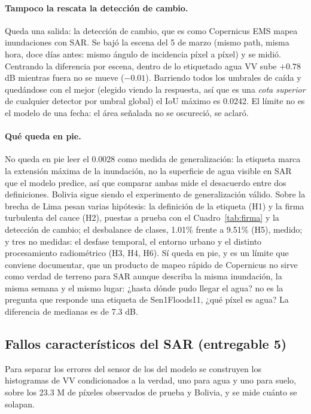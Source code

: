 \documentclass{article}
\begin{document}
\paragraph{Tampoco la rescata la detección de cambio.}
Queda una salida: la detección de cambio, que es como Copernicus EMS mapea
inundaciones con SAR. Se bajó la escena del 5 de
marzo (mismo path, misma hora, doce días antes: mismo ángulo de incidencia
píxel a píxel) y se midió. Centrando la diferencia por escena, dentro de lo
etiquetado agua VV sube $+0.78$ dB mientras fuera no se mueve ($-0.01$).
Barriendo todos los umbrales de caída y quedándose con el mejor (elegido
viendo la respuesta, así que es una \emph{cota superior} de cualquier detector
por umbral global) el IoU máximo es 0.0242. El límite no es el modelo
de una fecha: el área señalada no se oscureció, se aclaró.

\paragraph{Qué queda en pie.}
No queda en pie leer el 0.0028 como medida de generalización: la
etiqueta marca la extensión máxima de la inundación, no la superficie de agua
visible en SAR que el modelo predice, así que comparar ambas mide el desacuerdo
entre dos definiciones. Bolivia sigue siendo el experimento de generalización
válido. Sobre la brecha de Lima pesan varias hipótesis: la definición de la
etiqueta (H1) y la firma turbulenta del cauce (H2), puestas a prueba con el
Cuadro~\ref{tab:firma} y la detección de cambio; el desbalance de clases, 1.01\%
frente a 9.51\% (H5), medido; y tres no medidas: el desfase temporal, el entorno
urbano y el distinto procesamiento radiométrico (H3, H4, H6). Sí queda en pie, y es un límite que conviene
documentar, que un producto de mapeo rápido de Copernicus no sirve como verdad de
terreno para SAR aunque describa la misma inundación, la misma semana y el mismo
lugar: ¿hasta dónde pudo llegar el agua? no es la pregunta que responde una
etiqueta de Sen1Floods11, ¿qué píxel es agua? La diferencia de medianas es de
7.3 dB.

\subsection{Fallos característicos del SAR (entregable 5)}
\label{sec:fallos}

Para separar los errores del sensor de los del modelo se construyen los
histogramas de VV condicionados a la verdad, uno para agua y uno
para suelo, sobre los 23.3 M de píxeles observados de prueba y Bolivia, y se
mide cuánto se solapan.
\end{document}
